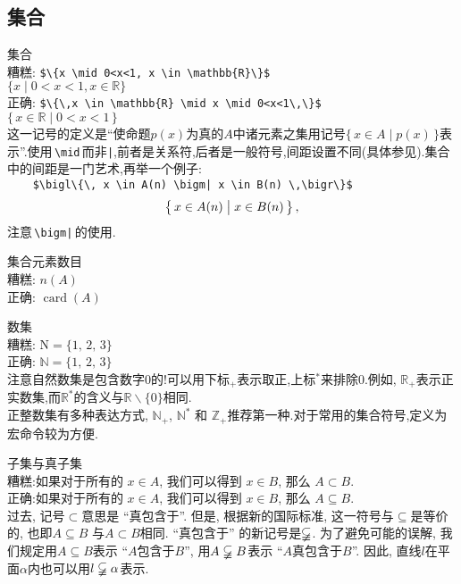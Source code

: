 \documentclass[a4paper]{article}
\newcommand{\mpunct}[1]{\,#1}                         %
\newcommand{\sj}{\hspace*{2.8em}}
\newcommand{\scite}[1]{\CJKecglue\cite{#1}}
\begin{document}
\subsection{集合}
\begin{compactitem}[\hspace{1.02em}$\bullet$]
	\item 集合\\
	\textsf{糟糕}: \verb|$\{x \mid 0<x<1, x \in \mathbb{R}\}$|\\
	 \sj $\{x \mid 0<x<1, x \in \mathbb{R}\}$\\
	\textsf{正确}: \verb|$\{\,x \in \mathbb{R} \mid x \mid 0<x<1\,\}$|\\
     \sj $\{\,x \in \mathbb{R} \mid  0<x<1\,\}$\\
	这一记号的定义是``使命题$p(x)$为真的$A$中诸元素之集用记号$\{\,x\in A\mid p(x)\,\}$表示''.使用\,\verb|\mid|\,而非\texttt{|},前者是关系符,后者是一般符号,间距设置不同(具体参见\scite{26}).集合中的间距是一门艺术,再举一个例子:\\
	\verb!    $\bigl\{\, x \in A(n) \bigm| x \in B(n) \,\bigr\}$!
	$$
	\bigl\{\,x\in A(n)\bigm| x\in B(n)\,\bigr\}\mpunct{,}
	$$
	注意\,\verb!\bigm|!\,的使用.
	\item 集合元素数目\\
	\textsf{糟糕}: $n(A)$\\
	\textsf{正确}: $\operatorname{card}(A)$
	\item 数集\\
	\textsf{糟糕}: $\mathrm{N}=\{1,\,2,\,3\}$\\
	\textsf{正确}: $\mathbb{N}=\{1,\,2,\,3\}$\\
	注意自然数集是包含数字0的!可以用下标$_+$表示取正,上标$^*$来排除0.例如, $\mathbb{R}_+$表示正实数集,而$\mathbb{R}^*$的含义与$\mathbb{R}\backslash \{0\}$相同.\\
	正整数集有多种表达方式, $\mathbb{N}_+$, $\mathbb{N}^*$ 和 $\mathbb{Z}_+$推荐第一种.对于常用的集合符号,定义为宏命令较为方便.
	\item 子集与真子集\\
	\textsf{糟糕}:如果对于所有的 $x \in A$, 我们可以得到 $x \in B$, 那么 $A \subset B$.\\
	\textsf{正确}:如果对于所有的 $x \in A$, 我们可以得到 $x \in B$, 那么 $A \subseteq B$.\\
	过去, 记号$\subset$意思是 ``真包含于''. 但是, 根据新的国际标准, 这一符号与$\subseteq$是等价的, 也即$A \subseteq B$ 与$A \subset B$相同. ``真包含于'' 的新记号是$\varsubsetneqq$. 为了避免可能的误解, 我们规定用$A \subseteq B$表示 ``$A$包含于$B$'', 用$A \varsubsetneqq B$表示 ``$A$真包含于$B$''. 因此, 直线$l$在平面$\alpha$内也可以用$l \varsubsetneqq \alpha$表示.

\end{compactitem}
\end{document}
